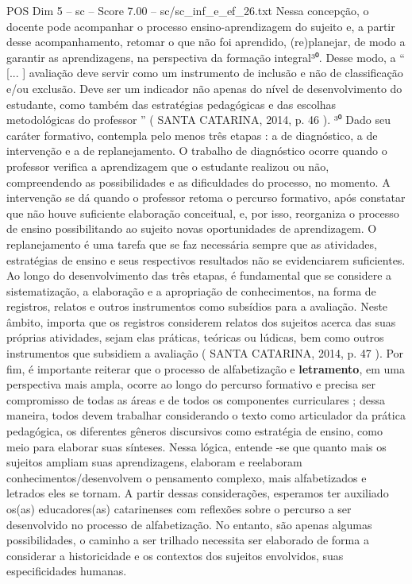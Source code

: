 \begin{textsample}{POS Dim 5 – sc – Score 7.00 – sc/sc\_inf\_e\_ef\_26.txt}
Nessa concepção, o docente pode acompanhar o processo ensino-aprendizagem do sujeito e, a partir desse acompanhamento, retomar o que não foi aprendido, (re)planejar, de modo a garantir as aprendizagens, na perspectiva da formação integral³⁰.
Desse modo, a “ [... ] avaliação deve servir como um instrumento de inclusão e não de classificação e/ou exclusão.
Deve ser um indicador não apenas do nível de desenvolvimento do estudante, como também das estratégias pedagógicas e das escolhas metodológicas do professor ” ( SANTA CATARINA, 2014, p. 46 ). ³⁰ Dado seu caráter formativo, contempla pelo menos três etapas : a de diagnóstico, a de intervenção e a de replanejamento.
O trabalho de diagnóstico ocorre quando o professor verifica a aprendizagem que o estudante realizou ou não, compreendendo as possibilidades e as dificuldades do processo, no momento.
A intervenção se dá quando o professor retoma o percurso formativo, após constatar que não houve suficiente elaboração conceitual, e, por isso, reorganiza o processo de ensino possibilitando ao sujeito novas oportunidades de aprendizagem.
O replanejamento é uma tarefa que se faz necessária sempre que as atividades, estratégias de ensino e seus respectivos resultados não se evidenciarem suficientes.
Ao longo do desenvolvimento das três etapas, é fundamental que se considere a sistematização, a elaboração e a apropriação de conhecimentos, na forma de registros, relatos e outros instrumentos como subsídios para a avaliação.
Neste âmbito, importa que os registros considerem relatos dos sujeitos acerca das suas próprias atividades, sejam elas práticas, teóricas ou lúdicas, bem como outros instrumentos que subsidiem a avaliação ( SANTA CATARINA, 2014, p. 47 ).
Por fim, é importante reiterar que o processo de alfabetização e \textbf{letramento}, em uma perspectiva mais ampla, ocorre ao longo do percurso formativo e precisa ser compromisso de todas as áreas e de todos os componentes curriculares ; dessa maneira, todos devem trabalhar considerando o texto como articulador da prática pedagógica, os diferentes gêneros discursivos como estratégia de ensino, como meio para elaborar suas sínteses.
Nessa lógica, entende -se que quanto mais os sujeitos ampliam suas aprendizagens, elaboram e reelaboram conhecimentos/desenvolvem o pensamento complexo, mais alfabetizados e letrados eles se tornam.
A partir dessas considerações, esperamos ter auxiliado os(as) educadores(as) catarinenses com reflexões sobre o percurso a ser desenvolvido no processo de alfabetização.
No entanto, são apenas algumas possibilidades, o caminho a ser trilhado necessita ser elaborado de forma a considerar a historicidade e os contextos dos sujeitos envolvidos, suas especificidades humanas.

\end{textsample}

